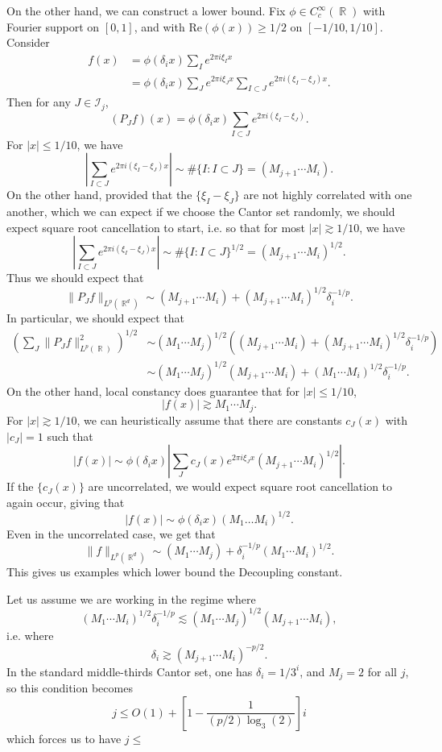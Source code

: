 \documentclass[dvipsnames,letterpaper,12pt]{article}
\numberwithin{equation}{section}
\DeclareMathOperator{\RR}{\mathbb{R}}
\numberwithin{theorem}{section}
\begin{document}
On the other hand, we can construct a lower bound. Fix $\phi \in C_c^\infty(\RR)$ with Fourier support on $[0,1]$, and with $\text{Re}(\phi(x)) \geq 1/2$ on $[-1/10, 1/10]$. Consider
%
\begin{align*}
    f(x) &= \phi(\delta_i x) \sum_I e^{2 \pi i \xi_I x}\\
    &= \phi(\delta_i x) \sum_J e^{2 \pi i \xi_J x} \sum_{I \subset J} e^{2 \pi i (\xi_I - \xi_J) x}.
\end{align*}
%
Then for any $J \in \mathcal{I}_j$,
%
\[ (P_J f)(x) = \phi(\delta_i x) \sum_{I \subset J} e^{2 \pi i (\xi_I - \xi_J)}. \]
%
For $|x| \leq 1/10$, we have
%
\[ \left| \sum_{I \subset J} e^{2 \pi i (\xi_I - \xi_J) x} \right| \sim \# \{ I : I \subset J \} = (M_{j+1} \cdots M_i). \]
%
On the other hand, provided that the $\{ \xi_I - \xi_J \}$ are not highly correlated with one another, which we can expect if we choose the Cantor set randomly, we should expect square root cancellation to start, i.e. so that for most $|x| \gtrsim 1/10$, we have
%
\[ \left| \sum_{I \subset J} e^{2 \pi i (\xi_I - \xi_J) x} \right| \sim \# \{ I : I \subset J \}^{1/2} = (M_{j+1} \cdots M_i)^{1/2}. \]
%
Thus we should expect that
\[ \| P_J f \|_{L^p(\RR^d)} \sim (M_{j+1} \cdots M_i) + (M_{j+1} \cdots M_i)^{1/2} \delta_i^{-1/p}. \]
%
In particular, we should expect that
%
\begin{align*}
    \left( \sum_J \| P_J f \|_{L^p(\RR)}^2 \right)^{1/2} &\sim (M_1 \cdots M_j)^{1/2} \left( (M_{j+1} \cdots M_i) + (M_{j+1} \cdots M_i)^{1/2} \delta_i^{-1/p} \right)\\
    &\sim (M_1 \cdots M_j)^{1/2} (M_{j+1} \cdots M_i) + (M_1 \cdots M_i)^{1/2} \delta_i^{-1/p}.
\end{align*}
%
On the other hand, local constancy does guarantee that for $|x| \leq 1/10$,
%
\[ |f(x)| \gtrsim M_1 \cdots M_j. \]
%
For $|x| \gtrsim 1/10$, we can heuristically assume that there are constants $c_J(x)$ with $|c_J| = 1$ such that
%
\[ |f(x)| \sim \phi(\delta_i x) \left| \sum_J c_J(x) e^{2 \pi i \xi_J x} (M_{j+1} \cdots M_i)^{1/2} \right|. \]
%
If the $\{ c_J(x) \}$ are uncorrelated, we would expect square root cancellation to again occur, giving that
%
\[ |f(x)| \sim \phi(\delta_i x) (M_1 \dots M_i)^{1/2}. \]
%
Even in the uncorrelated case, we get that
%
\[ \| f \|_{L^p(\RR^d)} \sim (M_1 \cdots M_j) + \delta_i^{-1/p} (M_1 \cdots M_i)^{1/2}. \]
%
This gives us examples which lower bound the Decoupling constant.

Let us assume we are working in the regime where
%
\[ (M_1 \cdots M_i)^{1/2} \delta_i^{-1/p} \lesssim (M_1 \cdots M_j)^{1/2} (M_{j+1} \cdots M_i), \]
%
i.e. where
%
\[ \delta_i \gtrsim (M_{j+1} \cdots M_i)^{-p/2}. \]
%
In the standard middle-thirds Cantor set, one has $\delta_i = 1/3^i$, and $M_j = 2$ for all $j$, so this condition becomes
%
\[ j \leq O(1) + \left[ 1 - \frac{1}{(p/2) \log_3(2)} \right] i \]
%
which forces us to have $j \leq $
\end{document}
